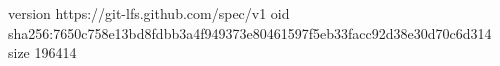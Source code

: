 version https://git-lfs.github.com/spec/v1
oid sha256:7650c758e13bd8fdbb3a4f949373e80461597f5eb33facc92d38e30d70c6d314
size 196414
